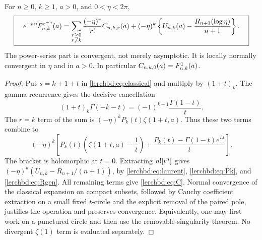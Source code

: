 \begin{theorem}\label{lerchbd:thm:abel}
For $n\ge0$, $k\ge1$, $a>0$, and $0<\eta<2\pi$,
\begin{equation}\label{lerchbd:eq:abel}
 \boxed{\quad
 e^{-a\eta}F_{n,k}^{e^{-\eta}}(a)
 =\sum_{\substack{r\ge0\\r\ne k}}
       \frac{(-\eta)^r}{r!}C_{n,k,r}(a)
  +(-\eta)^k\left\{U_{n,k}(a)-\frac{R_{n+1}(\log\eta)}{n+1}\right\}.
 \quad}
\end{equation}
The power-series part is convergent, not merely asymptotic. It is locally normally convergent in $\eta$ and in $a>0$. In particular $C_{n,k,0}(a)=F_{n,k}^{1}(a)$.
\end{theorem}
\begin{proof}
Put $s=k+1+t$ in \eqref{lerchbd:eq:classical} and multiply by $(1+t)_k$. The gamma recurrence gives the decisive cancellation
\begin{equation}\label{lerchbd:eq:universal-cancel}
 (1+t)_k\Gamma(-k-t)=(-1)^{k+1}\frac{\Gamma(1-t)}t.
\end{equation}
The $r=k$ term of the sum is $(-\eta)^kP_k(t)\zeta(1+t,a)$. Thus these two terms combine to
\[
 (-\eta)^k\left[
 P_k(t)\left(\zeta(1+t,a)-\frac1t\right)
 +\frac{P_k(t)-\Gamma(1-t)e^{Lt}}t\right].
\]
The bracket is holomorphic at $t=0$. Extracting $n![t^{n}]$ gives $(-\eta)^k(U_{n,k}-R_{n+1}/(n+1))$, by \eqref{lerchbd:eq:laurent}, \eqref{lerchbd:eq:Pk}, and \eqref{lerchbd:eq:Rgen}. All remaining terms give \eqref{lerchbd:eq:C}. Normal convergence of the classical expansion on compact subsets, followed by Cauchy coefficient extraction on a small fixed $t$-circle and the explicit removal of the paired pole, justifies the operation and preserves convergence. Equivalently, one may first work on a punctured circle and then use the removable-singularity theorem. No divergent $\zeta(1)$ term is evaluated separately.
\end{proof}

